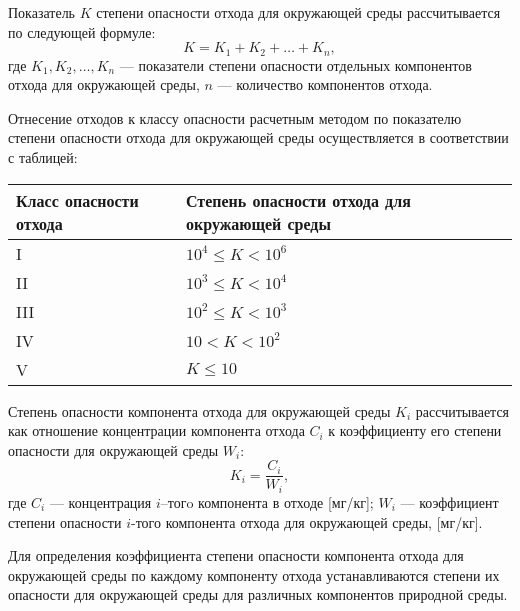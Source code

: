 
Показатель $K$ степени опасности отхода для окружающей среды рассчитывается по следующей формуле:
$$
K=K_1+K_2+\dots +K_n,
$$
где $K_1, K_2, \ldots, K_n$ --- показатели степени опасности отдельных компонентов отхода для окружающей среды, 
$n$ --- количество компонентов отхода.


Отнесение отходов к классу опасности расчетным методом по показателю степени опасности отхода для окружающей 
среды осуществляется в соответствии с таблицей:

\bigskip

\noindent


\begin{tabu}to \textwidth{|X[c]|X[c]|}%
\hline%
%
\textbf{Класс опасности отхода}&\textbf{Степень опасности 	отхода для окружающей среды}\\%
\hline%
I&$10^4 \leq  K < 10^6 $\\%
\hline%
II&$10^3 \leq  K < 10^4 $\\%
\hline%
III&$10^2 \leq   K  < 10^3 $\\%
\hline%
IV&$10 < K < 10^2 $\\%
\hline%
V&$K \leq 10 $\\%
\hline
\end{tabu}
\bigskip


Степень опасности компонента отхода для окружающей среды $K_i$
рассчитывается как отношение концентрации компонента отхода $C_i$ к коэффициенту его степени опасности для окружающей среды $W_i$:
$$K_i = \frac{C_i}{W_i},$$
где $C_i$ --- концентрация $i$--тогo компонента в отходе [мг/кг]; 
         $W_i$ --- коэффициент степени опасности $i$-того компонента отхода для окружающей среды, [мг/кг].
        

Для определения коэффициента степени опасности компонента отхода для окружающей среды 
по каждому компоненту отхода устанавливаются степени их опасности для окружающей среды для различных компонентов природной среды.

